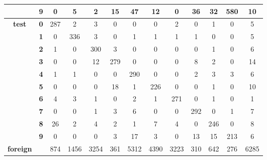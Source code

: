 \begin{table}[htp]
{\begin{tabular}{|c|c|c|c|c|c|c|c|c|c|c|c|c|}
			& \textbf{9} & 0          & 5          & 2          & 15         & 47         & 12         & 0          & 36         & 32         & 580        & 10               \\ \hline
			\multirow{10}{*}{\textbf{test}}     & \textbf{0} & 287        & 2          & 3          & 0          & 0          & 0          & 2          & 0          & 1          & 0          & 5                \\ \cline{2-13} 
			& \textbf{1} & 0          & 336        & 3          & 0          & 1          & 1          & 1          & 1          & 0          & 0          & 5                \\ \cline{2-13} 
			& \textbf{2} & 1          & 0          & 300        & 3          & 0          & 0          & 0          & 0          & 1          & 0          & 6                \\ \cline{2-13} 
			& \textbf{3} & 0          & 0          & 12         & 279        & 0          & 0          & 0          & 8          & 2          & 0          & 14               \\ \cline{2-13} 
			& \textbf{4} & 1          & 1          & 0          & 0          & 290        & 0          & 0          & 2          & 3          & 3          & 6                \\ \cline{2-13} 
			& \textbf{5} & 0          & 0          & 0          & 18         & 1          & 226        & 0          & 0          & 1          & 0          & 10               \\ \cline{2-13} 
			& \textbf{6} & 4          & 3          & 1          & 0          & 2          & 1          & 271        & 0          & 1          & 0          & 1                \\ \cline{2-13} 
			& \textbf{7} & 0          & 0          & 1          & 3          & 6          & 0          & 0          & 292        & 0          & 1          & 7                \\ \cline{2-13} 
			& \textbf{8} & 26         & 2          & 4          & 2          & 1          & 7          & 4          & 0          & 246        & 0          & 8                \\ \cline{2-13} 
			& \textbf{9} & 0          & 0          & 0          & 3          & 17         & 3          & 0          & 13         & 15         & 213        & 6                \\ \hline
			\textbf{foreign}                    & \textbf{}  & 874        & 1456       & 3254       & 361        & 5312       & 4390       & 3223       & 310        & 642        & 276        & 6285             \\ \hline
		\end{tabular}
	}
\end{table}